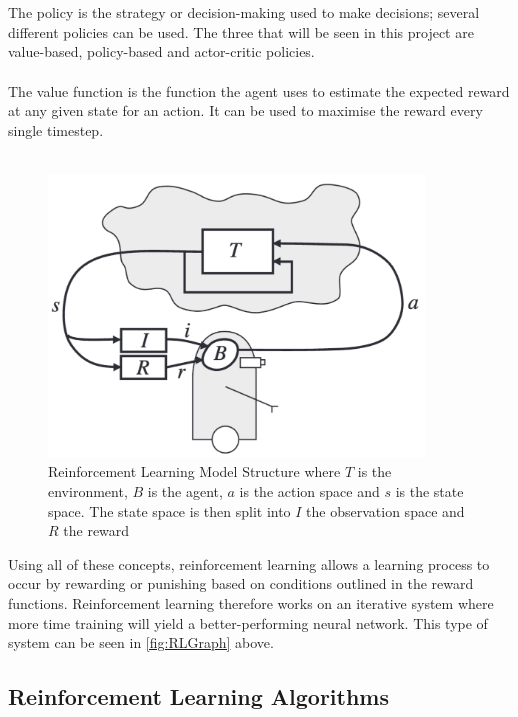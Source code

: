 \documentclass[a4paper,12pt]{article}
\begin{document}
\\\\
The policy is the strategy or decision-making used to make decisions; several different policies can be used. The three that will be seen in this project are value-based, policy-based and actor-critic policies.
\\\\
The value function is the function the agent uses to estimate the expected reward at any given state for an action. It can be used to maximise the reward every single timestep.
\\\\
\begin{figure}[H]
\centering
\includegraphics[width=10cm]{./imgs/RLGraph.png}
\caption{Reinforcement Learning Model Structure where $T$ is the environment, $B$ is the agent, $a$ is the action space and $s$ is the state space. The state space is then split into $I$ the observation space and $R$ the reward \cite{kaelbling1996reinforcement}}
\label{fig:RLGraph}
\end{figure}
\noindent
Using all of these concepts, reinforcement learning allows a learning process to occur by rewarding or punishing based on conditions outlined in the reward functions. Reinforcement learning therefore works on an iterative system where more time training will yield a better-performing neural network. This type of system can be seen in \autoref{fig:RLGraph} above.

\subsection{Reinforcement Learning Algorithms}
\end{document}
